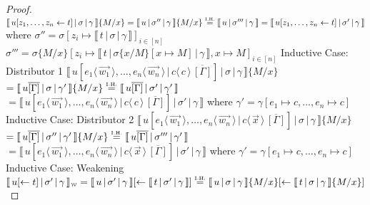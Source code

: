 \documentclass[a4paper,UKenglish,cleveref, autoref]{lipics-v2019}
\newcommand{\share}[3]{#1 [#2 \leftarrow #3]}
\newcommand{\dist}[5]{#1 [ #2 \, \vert \, \fakedist{#4}{#5} \, #3 ]}
\newcommand{\fakedist}[2]{#1 \langle \, #2 \, \rangle}
\newcommand{\sub}[3]{#1 \{ #2 / #3 \}}
\newcommand{\weaksymbol}{\mbox{\tiny $\mathcal{W}$}}
\newcommand{\readbackwmap}[3]{\llbracket \, #1 \, \vert \, #2 \, \vert \, #3  \, \rrbracket }
\newcommand{\readweakwmap}[3]{\llbracket \, #1 \, \vert \, #2 \, \vert \, #3  \, \rrbracket_{\weaksymbol} }
\newcommand{\IH}{\stackrel{\hbox{\tiny I.H.}}{\hbox{=}}}
\begin{document}
\begin{proof}
\newline
$\readbackwmap{\share{u}{z_{1}, \dots, z_{n}}{t}}{\sigma}{\gamma} \sub{}{M}{x} = \readbackwmap{u}{\sigma''}{\gamma} \sub{}{M}{x} \IH \readbackwmap{u}{\sigma'''}{\gamma} = \readbackwmap{\share{u}{z_{1}, \dots, z_{n}}{t}}{\sigma'}{\gamma}$
\newline
where
\newline
$\sigma'' = \sigma [z_{i} \mapsto \readbackwmap{t}{\sigma}{\gamma}]_{i \in [n]}$
\newline
$\sigma''' = \sigma \sub{}{M}{x} [z_{i} \mapsto \readbackwmap{t}{\sigma \sub{}{x}{M} [x \mapsto M]}{\gamma} , x \mapsto M]_{i \in [n]}$
\newline
\newline
Inductive Case: Distributor 1
\newline
$\readbackwmap{\dist{u}{\fakedist{e_{1}}{\vec{w_{1}}}, \dots, \fakedist{e_{n}}{\vec{w_{n}}}}{\overline{[\Gamma]}}{c}{c}}{\sigma}{\gamma} \sub{}{M}{x}$
\newline
$= \readbackwmap{u \overline{[\Gamma]}}{\sigma}{\gamma'} \sub{}{M}{x} \IH \readbackwmap{u \overline{[\Gamma]}}{\sigma'}{\gamma'}$
\newline
$= \readbackwmap{\dist{u}{\fakedist{e_{1}}{\vec{w_{1}}}, \dots, \fakedist{e_{n}}{\vec{w_{n}}}}{\overline{[\Gamma]}}{c}{c}}{\sigma'}{\gamma}$
\newline
where
\newline
$\gamma' = \gamma [e_{1} \mapsto c, \dots, e_{n} \mapsto c]$
\newline
\newline
Inductive Case: Distributor 2
\newline
$\readbackwmap{\dist{u}{\fakedist{e_{1}}{\vec{w_{1}}}, \dots, \fakedist{e_{n}}{\vec{w_{n}}}}{\overline{[\Gamma]}}{c}{\vec{x}}}{\sigma}{\gamma} \sub{}{M}{x}$
\newline
$= \readbackwmap{u \overline{[\Gamma]}}{\sigma''}{\gamma'} \sub{}{M}{x} \IH \readbackwmap{u \overline{[\Gamma]}}{\sigma'''}{\gamma'}$
\newline
$= \readbackwmap{\dist{u}{\fakedist{e_{1}}{\vec{w_{1}}}, \dots, \fakedist{e_{n}}{\vec{w_{n}}}}{\overline{[\Gamma]}}{c}{\vec{x}}}{\sigma'}{\gamma}$
\newline
where
\newline
$\gamma' = \gamma [e_{1} \mapsto c, \dots, e_{n} \mapsto c]$
\newline
\newline
Inductive Case: Weakening
\newline
$\readweakwmap{\share{u}{}{t}}{\sigma'}{\gamma} = \share{\readbackwmap{u}{\sigma'}{\gamma}}{}{\readbackwmap{t}{\sigma'}{\gamma}} \IH \share{\readbackwmap{u}{\sigma}{\gamma} \sub{}{M}{x}}{}{\readbackwmap{t}{\sigma}{\gamma} \sub{}{M}{x}} $

\end{proof}
\end{document}
